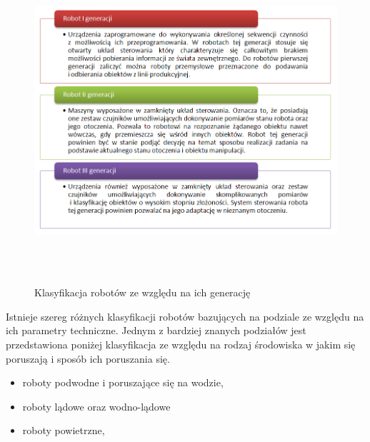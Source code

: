 \begin{figure}[h!]
 \centering \includegraphics[height=120mm]{../images/ch01/robot_generations.png}
 \caption{Klasyfikacja robotów ze względu na ich generację}
 \label{fig:RobotsGenerations}
\end{figure}

Istnieje szereg różnych klasyfikacji robotów bazujących na podziale ze względu na
ich parametry techniczne. Jednym z bardziej znanych podziałów jest przedstawiona
poniżej klasyfikacja ze względu na rodzaj środowiska w jakim się poruszają i
sposób ich poruszania się.
\begin{itemize}
  \item roboty podwodne i poruszające się na wodzie,
  \item roboty lądowe oraz wodno-lądowe
  \item roboty powietrzne,
\end{itemize}


